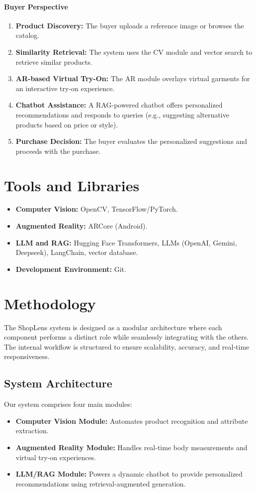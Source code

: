 \subsubsection{Buyer Perspective}
\begin{enumerate}
    \item \textbf{Product Discovery:} The buyer uploads a reference image or browses the catalog.
    \item \textbf{Similarity Retrieval:} The system uses the CV module and vector search to retrieve similar products.
    \item \textbf{AR-based Virtual Try-On:} The AR module overlays virtual garments for an interactive try-on experience.
    \item \textbf{Chatbot Assistance:} A RAG-powered chatbot offers personalized recommendations and responds to queries (e.g., suggesting alternative products based on price or style).
    \item \textbf{Purchase Decision:} The buyer evaluates the personalized suggestions and proceeds with the purchase.
\end{enumerate}

\chapter{Tools and Libraries}
\begin{itemize}
    \item \textbf{Computer Vision:} OpenCV, TensorFlow/PyTorch.
    \item \textbf{Augmented Reality:} ARCore (Android).
    \item \textbf{LLM and RAG:} Hugging Face Transformers, LLMs (OpenAI, Gemini, Deepseek), LangChain, vector database.
    \item \textbf{Development Environment:} Git.
\end{itemize}

\chapter{Methodology}
The ShopLens system is designed as a modular architecture where each component performs a distinct role while seamlessly integrating with the others. The internal workflow is structured to ensure scalability, accuracy, and real-time responsiveness.

\section{System Architecture}
Our system comprises four main modules:
\begin{itemize}
    \item \textbf{Computer Vision Module:} Automates product recognition and attribute extraction.
    \item \textbf{Augmented Reality Module:} Handles real-time body measurements and virtual try-on experiences.
    \item \textbf{LLM/RAG Module:} Powers a dynamic chatbot to provide personalized recommendations using retrieval-augmented generation.
\end{itemize}

